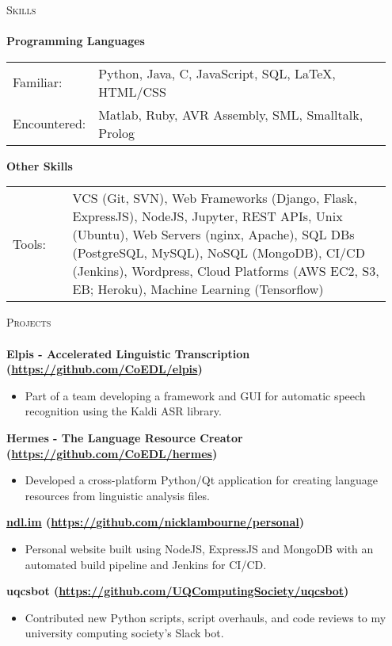 \documentclass[a4paper]{article}
\newcommand{\lineunder} {
    \vspace*{-8pt} \\
    \hspace*{-10pt} \hrulefill \\
}
\newcommand{\header} [1] {
    {\hspace*{-10pt}\vspace*{6pt} \textsc{#1}}
    \vspace*{-6pt} \lineunder
}
\newenvironment{singleitem}
{   \small
    \vspace{-2.6pt}
    \begin{itemize}
    \setlength{\itemsep}{0pt}
    \setlength{\parskip}{0pt}
    \setlength{\parsep}{0pt}   }
{\end{itemize} \vspace{-2.6pt}	}
\begin{document}
\vspace{-1mm}
\header{Skills}
\textbf{Programming Languages}
\begin{tabular}{p{0.15\linewidth}p{0.80\linewidth}}
	\small Familiar: & \small Python, Java, C, JavaScript, SQL, \LaTeX, HTML/CSS \\
	\small Encountered: & \small Matlab, Ruby, AVR Assembly, SML, Smalltalk, Prolog\\
\end{tabular}
\textbf{Other Skills}
\begin{tabular}{p{0.15\linewidth}p{0.80\linewidth}}
	\small Tools: & \small VCS (Git, SVN), Web Frameworks (Django, Flask, ExpressJS), NodeJS,  Jupyter, REST APIs, Unix (Ubuntu), Web Servers (nginx, Apache), SQL DBs (PostgreSQL, MySQL), NoSQL (MongoDB), CI/CD (Jenkins), Wordpress, Cloud Platforms (AWS EC2, S3, EB; Heroku), Machine Learning (Tensorflow)
\end{tabular}

\vspace{0mm}

\header{Projects}

\textbf{{Elpis - Accelerated Linguistic Transcription} (\href{https://github.com/CoEDL/elpis}{https://github.com/CoEDL/elpis})}
\begin{singleitem}
	\item Part of a team developing a framework and GUI for automatic speech recognition using the Kaldi ASR library.
\end{singleitem}

\textbf{{Hermes - The Language Resource Creator} (\href{https://github.com/CoEDL/hermes}{https://github.com/CoEDL/hermes})}
\begin{singleitem}
	\item Developed a cross-platform Python/Qt application for creating language resources from linguistic analysis files.
\end{singleitem}

\textbf{\href{https://ndl.im}{ndl.im} (\href{https://github.com/nicklambourne/personal}{https://github.com/nicklambourne/personal})}
\begin{singleitem}
	\item Personal website built using NodeJS, ExpressJS and MongoDB with an automated build pipeline and Jenkins for CI/CD.
\end{singleitem}

\textbf{uqcsbot (\href{https://github.com/UQComputingSociety/uqcsbot}{https://github.com/UQComputingSociety/uqcsbot})}
\begin{singleitem}
	\item Contributed new Python scripts, script overhauls, and code reviews to my university computing society's Slack bot.
\end{singleitem}
\end{document}
